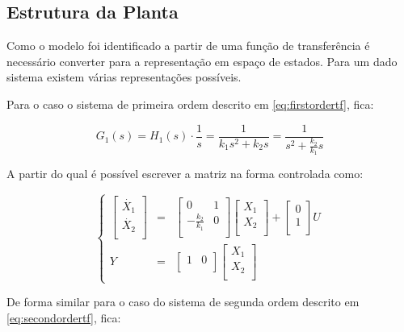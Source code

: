 \documentclass[a4paper,11pt]{article}
\begin{document}
\subsection{Estrutura da Planta}

Como o modelo foi identificado a partir de uma função de transferência é necessário converter para a representação em espaço de estados. Para um dado sistema existem várias representações possíveis.

Para o caso o sistema de primeira ordem descrito em \ref{eq:firstordertf}, fica:

$$
G_1(s) = H_1(s)\cdot \frac{1}{s} = \frac{1}{k_1 s^2+ k_2 s} = \frac{1}{s^2+ \frac{k_2}{k_1} s}
$$

A partir do qual é possível escrever a matriz na forma controlada como:

\begin{equation}
\left\{
\begin{array}{rcl}
\left[\begin{array}{c}
    \dot{X_1} \\
    \dot{X_2} \\
\end{array}
\right]
&
=
&
\left[
\begin{array}{cc}
    0 & 1 \\
    -\frac{k_2}{k_1} & 0 \\ 
\end{array}
\right]
\left[\begin{array}{c}
    X_1 \\
    X_2 \\
\end{array}
\right]
+
\left[\begin{array}{c}
    0 \\
    1 \\
\end{array}
\right]
U\\
Y & = &\left[
\begin{array}{cc}
    1 & 0 \\
\end{array}
\right]
\left[\begin{array}{c}
    X_1 \\
    X_2 \\
\end{array}
\right]
\end{array}
\right.
\end{equation}

De forma similar para o caso do sistema de segunda ordem descrito em \ref{eq:secondordertf}, fica:
\end{document}
